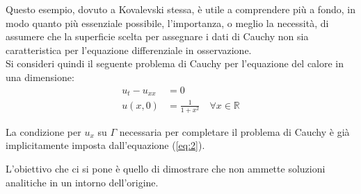 \begin{example}
Questo esempio, dovuto a Kovalevski stessa, è utile a comprendere più a fondo, in modo quanto più essenziale possibile, 
l'importanza, o meglio la necessità, di assumere che la superficie scelta per assegnare i dati di Cauchy non sia caratteristica 
per l'equazione differenziale in osservazione.\\ 
Si consideri quindi il seguente problema di Cauchy per l'equazione del calore in una dimensione:
\begin{align} 
	\label{eq:1}
	u_t-u_{xx}&=0\\ 
	\label{eq:2}
	u(x,0)&=\frac{1}{1+x^2} \quad \forall x \in \mathbb{R}
\end{align}
\begin{remark}
La condizione per $u_x$ su $\Gamma$ necessaria per completare il problema di Cauchy è già implicitamente imposta dall'equazione (\ref{eq:2}).
\end{remark}
L'obiettivo che ci si pone è quello di dimostrare che non ammette soluzioni analitiche in un intorno dell'origine.


\end{example}
